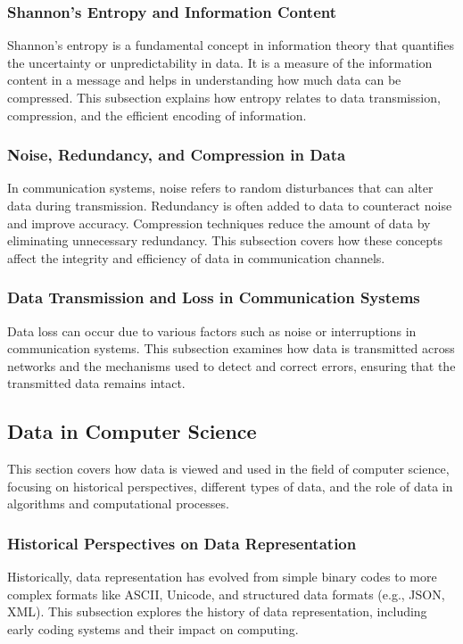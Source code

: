 \documentclass[12pt, oneside]{book}
\begin{document}
\subsubsection{Shannon's Entropy and Information Content}
Shannon's entropy is a fundamental concept in information theory that quantifies the uncertainty or unpredictability in data. It is a measure of the information content in a message and helps in understanding how much data can be compressed. This subsection explains how entropy relates to data transmission, compression, and the efficient encoding of information.

\subsubsection{Noise, Redundancy, and Compression in Data}
In communication systems, noise refers to random disturbances that can alter data during transmission. Redundancy is often added to data to counteract noise and improve accuracy. Compression techniques reduce the amount of data by eliminating unnecessary redundancy. This subsection covers how these concepts affect the integrity and efficiency of data in communication channels.

\subsubsection{Data Transmission and Loss in Communication Systems}
Data loss can occur due to various factors such as noise or interruptions in communication systems. This subsection examines how data is transmitted across networks and the mechanisms used to detect and correct errors, ensuring that the transmitted data remains intact.

\subsection{Data in Computer Science}
This section covers how data is viewed and used in the field of computer science, focusing on historical perspectives, different types of data, and the role of data in algorithms and computational processes.

\subsubsection{Historical Perspectives on Data Representation}
Historically, data representation has evolved from simple binary codes to more complex formats like ASCII, Unicode, and structured data formats (e.g., JSON, XML). This subsection explores the history of data representation, including early coding systems and their impact on computing.
\end{document}
